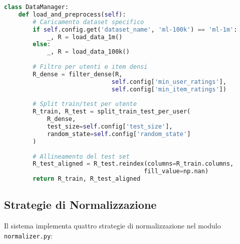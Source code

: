 \begin{lstlisting}[language=Python, caption=DataManager - Gestione dati]
class DataManager:
    def load_and_preprocess(self):
        # Caricamento dataset specifico
        if self.config.get('dataset_name', 'ml-100k') == 'ml-1m':
            _, R = load_data_1m()
        else:
            _, R = load_data_100k()
        
        # Filtro per utenti e item densi
        R_dense = filter_dense(R, 
                              self.config['min_user_ratings'], 
                              self.config['min_item_ratings'])
        
        # Split train/test per utente
        R_train, R_test = split_train_test_per_user(
            R_dense, 
            test_size=self.config['test_size'], 
            random_state=self.config['random_state']
        )
        
        # Allineamento del test set
        R_test_aligned = R_test.reindex(columns=R_train.columns, 
                                       fill_value=np.nan)
        return R_train, R_test_aligned
\end{lstlisting}

\subsection{Strategie di Normalizzazione}

Il sistema implementa quattro strategie di normalizzazione nel modulo \texttt{normalizer.py}:


